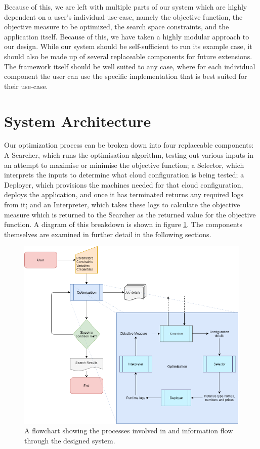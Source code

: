 \documentclass{report}
\begin{document}
Because of this, we are left with multiple parts of our system which are highly dependent on a user's individual use-case, namely the objective function, the objective measure to be optimized, the search space constraints, and the application itself. Because of this, we have taken a highly modular approach to our design. While our system should be self-sufficient to run its example case, it should also be made up of several replaceable components for future extensions. The framework itself should be well suited to any case, where for each individual component the user can use the specific implementation that is best suited for their use-case.
 
\section{System Architecture}
Our optimization process can be broken down into four replaceable components: A Searcher, which runs the optimisation algorithm, testing out various inputs in an attempt to maximise or minimise the objective function; a Selector, which interprets the inputs to determine what cloud configuration is being tested; a Deployer, which provisions the machines needed for that cloud configuration, deploys the application, and once it has terminated returns any required logs from it; and an Interpreter, which takes these logs to calculate the objective measure which is returned to the Searcher as the returned value for the objective function. A diagram of this breakdown is shown in figure \ref{fig:design}. The components themselves are examined in further detail in the following sections.
\begin{figure}[!hb]
  \centering
   \includegraphics[scale=0.5]{Design_flowchart}
  \caption{A flowchart showing the processes involved in and information flow through the designed system.}
  \label{fig:design}
\end{figure}
\newpage
 
\end{document}
